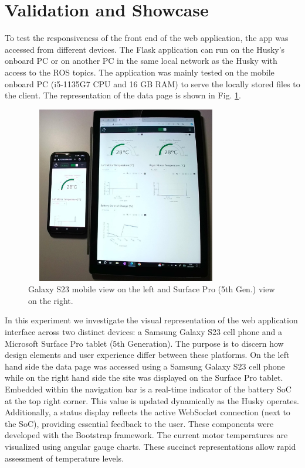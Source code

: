 \documentclass[conference]{IEEEtran}
\begin{document}
\section{Validation and Showcase}\label{VS}
To test the responsiveness of the front end of the web application, the app was accessed from different devices. The Flask application can run on the Husky's onboard PC or on another PC in the same local network as the Husky with access to the ROS topics. The application was mainly tested on the mobile onboard PC (i5-1135G7 CPU and 16 GB RAM) to serve the locally stored files to the client.
The representation of the data page is shown in Fig. \ref{fig:galaxysurface}. 
\begin{figure}[htbp]
    \centerline{\includegraphics[width=8.8cm, height=7.75cm]{Pictures/galaxysurfacecut.png}}
    \caption{Galaxy S23 mobile view on the left and Surface Pro (5th Gen.) view on the right.}
    \label{fig:galaxysurface}
\end{figure}
In this experiment we investigate the visual representation of the web application interface across two distinct devices: a Samsung Galaxy S23 cell phone and a Microsoft Surface Pro tablet (5th Generation). The purpose is to discern how design elements and user experience differ between these platforms.
On the left hand side the data page was accessed using a Samsung Galaxy S23 cell phone while on the right hand side the site was displayed on the Surface Pro tablet.
Embedded within the navigation bar is a real-time indicator of the battery SoC at the top right corner. This value is updated dynamically as the Husky operates.
Additionally, a status display reflects the active WebSocket connection (next to the SoC), providing essential feedback to the user.
These components were developed with the Bootstrap framework. The current motor temperatures are visualized using angular gauge charts. These succinct representations allow rapid assessment of temperature levels.
\end{document}

